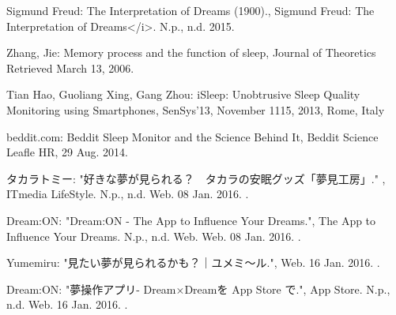 \begin{bib}[100]
\begin{flushleft}
  Sigmund Freud:
  \newblock The Interpretation of Dreams (1900).,
  \newblock Sigmund Freud: The Interpretation of Dreams</i>. N.p., n.d. 2015.
\end{flushleft}
 
\begin{flushleft}
 Zhang, Jie:
  \newblock Memory process and the function of sleep,
  \newblock Journal of Theoretics Retrieved March 13, 2006.
 \end{flushleft}
 
\begin{flushleft}
  Tian Hao, Guoliang Xing, Gang Zhou:
  \newblock  iSleep: Unobtrusive Sleep Quality Monitoring using Smartphones,
  \newblock SenSys’13,
  \newblock  November 1115, 2013, Rome, Italy
\end{flushleft}

\begin{flushleft}
  beddit.com:
  \newblock Beddit Sleep Monitor and the Science Behind It,
  \newblock Beddit Science Leafle HR, 29 Aug. 2014.
\end{flushleft}
  
\begin{flushleft}
  タカラトミー:
  \newblock "好きな夢が見られる？　タカラの安眠グッズ「夢見工房」." ,
  \newblock ITmedia LifeStyle. N.p., n.d.
  \newblock Web. 08 Jan. 2016.
  .
\end{flushleft}

\begin{flushleft}
  Dream:ON:
  \newblock "Dream:ON - The App to Influence Your Dreams.",
  \newblock The App to Influence Your Dreams. N.p., n.d. Web.
  \newblock Web. 08 Jan. 2016.
  .
\end{flushleft}

\begin{flushleft}
  Yumemiru:
  \newblock  "見たい夢が見られるかも？｜ユメミ〜ル.",
  \newblock Web. 16 Jan. 2016.
  .
\end{flushleft}

\begin{flushleft}
  Dream:ON:
  \newblock "夢操作アプリ- Dream×Dreamを App Store で.",
  \newblock App Store. N.p., n.d. Web. 16 Jan. 2016.
  .
\end{flushleft}


\end{bib}
